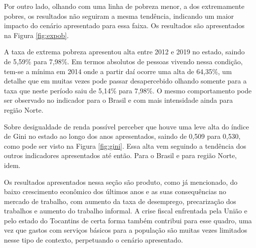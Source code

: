 \par Por outro lado, olhando com uma linha de pobreza menor, a dos extremamente pobres, os resultados não seguiram a mesma tendência, indicando um maior impacto do cenário apresentado para essa faixa. Os resultados são apresentados na Figura \ref{fig:expob}.

\par A taxa de extrema pobreza apresentou alta entre 2012 e 2019 no estado, saindo de 5,59\% para 7,98\%. Em termos absolutos de pessoas vivendo nessa condição, tem-se a mínima em 2014 onde a partir daí ocorre uma alta de 64,35\%, um detalhe que em muitas vezes pode passar desapercebido olhando somente para a taxa que neste período saiu de 5,14\% para 7,98\%. O mesmo comportamento pode ser observado no indicador para o Brasil e  com mais intensidade ainda para região Norte.

\par Sobre desigualdade de renda possível perceber que houve uma leve alta do índice de Gini no estado ao longo dos anos apresentados, saindo de 0,509 para 0,530, como pode ser visto na Figura \ref{fig:gini}. Essa alta vem seguindo a tendência dos outros indicadores apresentados até então. Para o Brasil e para região Norte, idem.
\par Os resultados apresentados nessa seção são produto, como já mencionado, do baixo crescimento econômico dos últimos anos e as suas consequências no mercado de trabalho, com aumento da taxa de desemprego, precarização dos trabalhos e aumento do trabalho informal. A crise fiscal enfrentada pela União e pelo estado do Tocantins de certa forma também contribui para esse quadro, uma vez que gastos com serviços básicos para a população são muitas vezes limitados nesse tipo de contexto, perpetuando o cenário apresentado.



